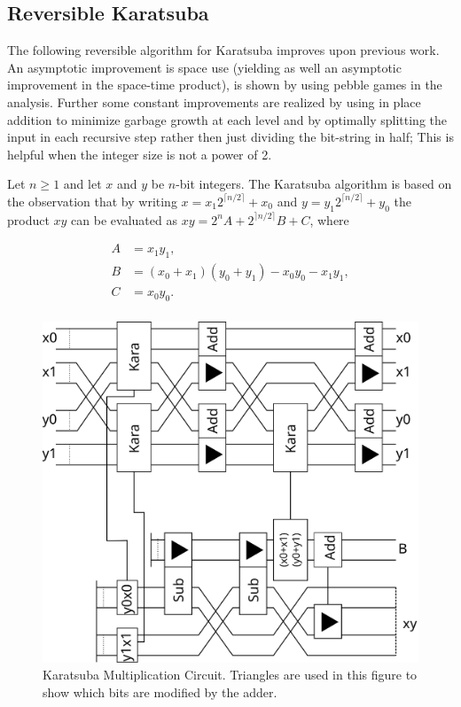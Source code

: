   \subsection{Reversible Karatsuba\label{sec:kara}}

    The following reversible algorithm for Karatsuba improves upon previous
    work\cite{PF:2006}. An asymptotic improvement is space use (yielding as
    well an asymptotic improvement in the space-time product), is shown by
    using pebble games in the analysis. Further some constant improvements are
    realized by using in place addition to minimize garbage growth at each
    level and by optimally splitting the input in each recursive step rather
    then just dividing the bit-string in half; This is helpful when the integer
    size is not a power of 2.

    Let $n\geq 1$ and let $x$ and $y$ be $n$-bit integers.  The
    Karatsuba\cite{KO:1963} algorithm is based on the observation that by
    writing $x=x_1 2^{\lceil n/2\rceil}+x_0$ and $y=y_1 2^{\lceil n/2\rceil
    }+y_0$ the product $xy$ can be evaluated as $xy=2^n A + 2^{\rceil n/2
    \rceil} B + C$, where

    \begin{align*}
      A &= x_1 y_1, \\
      B &= (x_0+x_1)(y_0+y_1) - x_0 y_0 - x_1 y_1,\\
      C &= x_0 y_0. \\
    \end{align*}
    \begin{figure}[ht]
      \capstart
      \centering
      \includegraphics[width=2\textwidth/3]{images/karatsuba2}
      \caption{Karatsuba Multiplication Circuit. Triangles are used in this figure to show which bits are modified by the adder.}
      \label{fig:kara2}
     \end{figure}

